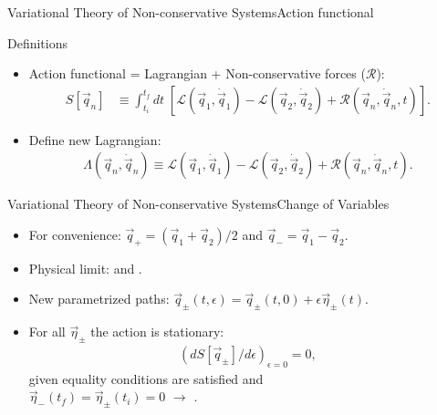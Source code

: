 \begin{frame}[c]{Variational Theory of Non-conservative Systems}{Action functional}
\begin{block}{Definitions}
\begin{itemize}
\item \textcolor{paleblue}{Action functional} = Lagrangian + Non-conservative forces ($\mathcal{R}$):
\begin{align}
S[\vec{q}_n] &\equiv \int_{t_i}^{t_f} dt \; \left[\mathcal{L} (\vec{q}_1, \dot{\vec{q}}_1)  - \mathcal{L}(\vec{q}_2, \dot{\vec{q}}_2) + \mathcal{R} (\vec{q}_n, \dot{\vec{q}}_n, t) \right]. \nonumber 
\end{align}
\item Define \textcolor{paleblue}{new Lagrangian}:
\begin{align}
\Lambda (\vec{q}_n, \dot{\vec{q}}_n) \equiv  \mathcal{L} (\vec{q}_1, \dot{\vec{q}}_1) - \mathcal{L} (\vec{q}_2, \dot{\vec{q}}_2) + \mathcal{R} (\vec{q}_n, \dot{\vec{q}}_n, t). \nonumber
\end{align}
\end{itemize}
\end{block}
\end{frame}

\begin{frame}[c]{Variational Theory of Non-conservative Systems}{Change of Variables}
 \begin{itemize}
\item For \textcolor{paleblue}{convenience}: $\vec{q}_+ = (\vec{q}_1 +\vec{q}_2)/2$ and $\vec{q}_- = \vec{q}_1  -\vec{q}_2$. 
\item Physical limit:   and .
\item New parametrized paths: $\vec{q}_{\pm} (t, \epsilon) = \vec{q}_{\pm} (t, 0) + \epsilon \vec{\eta}_{\pm}(t)$.
\item For all $\vec{\eta}_{\pm}$ the action is stationary: \begin{align}(dS[\vec{q}_\pm]/d\epsilon)_{\epsilon = 0} = 0, \nonumber \end{align}
 given equality conditions are satisfied and \\
 $\vec{\eta}_- (t_f)   =  \vec{\eta}_\pm(t_i)  = 0$ $\rightarrow$ .
\end{itemize}
\end{frame}


